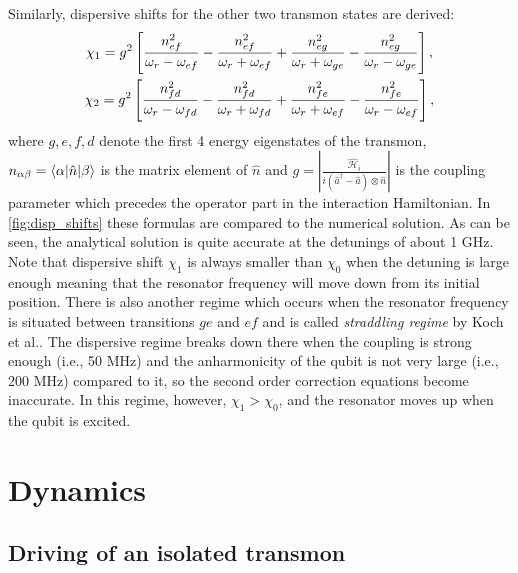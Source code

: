 Similarly, dispersive shifts for the other two transmon states are derived:
\begin{gather}
\chi_1 = g^2\left[ \frac{n_{ef}^2}{\omega_r - \omega_{ef}} - \frac{n_{ef}^2}{\omega_r + \omega_{ef}} + \frac{n_{eg}^2}{\omega_r + \omega_{ge}}-\frac{n_{eg}^2}{\omega_r - \omega_{ge} } \right],\label{eq:chi1}
\\
\chi_2 = g^2\left[ \frac{n_{fd}^2}{\omega_r - \omega_{fd}} -\frac{n_{fd}^2}{\omega_r + \omega_{fd}} + \frac{n_{fe}^2}{\omega_r + \omega_{ef}}- \frac{n_{fe}^2}{\omega_r -\omega_{ef}} \right],
\label{eq:chi2}
\end{gather}
where $g, e, f, d$ denote the first 4 energy eigenstates of the transmon, $n_{\alpha\beta} = \langle\alpha\rvert \hat n \lvert\beta\rangle$ is the matrix element of $\hat n$ and $g = \left.|\frac{\mathcal{\hat H}_i}{i(\hat a^\dag  - \hat a)\otimes \hat n}|\right.$ is the coupling parameter which precedes the operator part in the interaction Hamiltonian. In \autoref{fig:disp_shifts} these formulas are compared to the numerical solution. As can be seen, the analytical solution is quite accurate at the detunings of about 1 GHz. Note that dispersive shift $\chi_1$ is always smaller than $\chi_0$ when the detuning is large enough meaning that the resonator frequency will move down from its initial position. There is also another regime which occurs when the resonator frequency is situated between transitions $ge$ and $ef$ and is called \textit{straddling regime} by Koch et al.\cite{Koch2007}. The dispersive regime breaks down there when the coupling is strong enough (i.e., 50 MHz) and the anharmonicity of the qubit is not very large (i.e., 200 MHz) compared to it, so the second order correction equations become inaccurate. In this regime, however, $\chi_1>\chi_0$, and the resonator moves up when the qubit is excited.


\section{Dynamics}\label{sec:dynamics}

\subsection{Driving of an isolated transmon}

